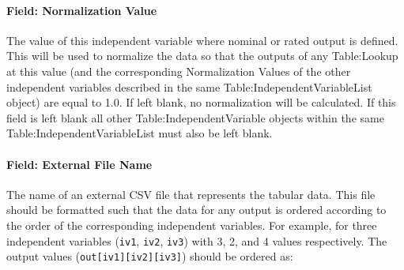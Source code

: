 \paragraph{Field: Normalization
Value}\label{field-normalization-value}

The value of this independent variable where nominal or rated output is
defined. This will be used to normalize the data so that the outputs of
any Table:Lookup at this value (and the corresponding Normalization
Values of the other independent variables described in the same
Table:IndependentVariableList object) are equal to 1.0. If left blank, no
normalization will be calculated. If this field is left blank all other
Table:IndependentVariable objects within the same Table:IndependentVariableList
must also be left blank.

\paragraph{Field: External File
Name}\label{field-external-file-name-1}

The name of an external CSV file that represents the tabular data. This
file should be formatted such that the data for any output is ordered
according to the order of the corresponding independent variables. For
example, for three independent variables (\texttt{iv1}, \texttt{iv2},
\texttt{iv3}) with 3, 2, and 4 values respectively. The output values
(\texttt{out{[}iv1{]}{[}iv2{]}{[}iv3{]}}) should be ordered as:


